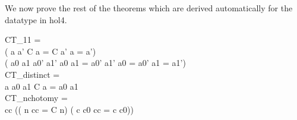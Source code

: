 We now prove the rest of the theorems which are derived automatically for the datatype in hol4.

\begin{GFT}{}
\+\PrNL{}CT\_11\PrNN{} =\\
\+	\MMM{\Zthm} (\MMM{\forall} a a'\MMM{\bullet} C a = C a' \MMM{\Rightarrow} a = a')\\
\+	\MMM{\land} (\MMM{\forall} a0 a1 a0' a1'\MMM{\bullet} a0  a1 = a0'  a1' \MMM{\Rightarrow} a0 = a0' \MMM{\land} a1 = a1')\\
\+\PrNL{}CT\_distinct\PrNN{} =\\
\+	\MMM{\Zthm} \MMM{\forall} a a0 a1\MMM{\bullet} \MMM{\lnot} C a = a0  a1\\
\+\PrNL{}CT\_nchotomy\PrNN{} =\\
\+	\MMM{\Zthm} \MMM{\forall} cc\MMM{\bullet} \MMM{\lnot} ((\MMM{\exists} n\MMM{\bullet} cc = C n) \MMM{\Leftrightarrow} (\MMM{\exists} c c0\MMM{\bullet} cc = c  c0))\\
\end{GFT}


